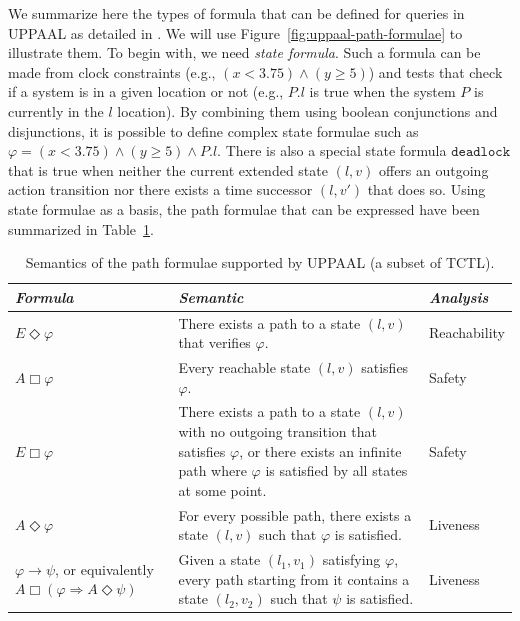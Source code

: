 We summarize here the types of formula that can be defined for queries in UPPAAL as detailed in \cite{UPPAAL}. We will use Figure~\ref{fig:uppaal-path-formulae} to illustrate them. To begin with, we need \emph{state formula}. Such a formula can be made from clock constraints (e.g., $(x < 3.75) \wedge (y \geq 5)$) and tests that check if a system is in a given location or not (e.g., $P.l$ is true when the system $P$ is currently in the $l$ location). By combining them using boolean conjunctions and disjunctions, it is possible to define complex state formulae such as $\varphi = (x < 3.75) \wedge (y \geq 5) \wedge P.l$. There is also a special state formula $\mathtt{deadlock}$ that is true when neither the current extended state $(l, v)$ offers an outgoing action transition nor there exists a time successor $(l, v')$ that does so. Using state formulae as a basis, the path formulae that can be expressed have been summarized in Table~\ref{tab:uppaal-path-formulae}.\\

\begin{table}[htbp]
\footnotesize
\centering
\begin{tabular}{|p{3cm}|p{7cm}|p{2cm}|}
  
  \hline
  
  \textit{Formula} &
  \textit{Semantic} &
  \textit{Analysis} \\
  
  \hline
  
  $E\Diamond \varphi$ &
  There exists a path to a state $(l, v)$ that verifies $\varphi$. &
  Reachability \\
  
  \hline
  
  $A\Box \varphi$ &
  Every reachable state $(l, v)$ satisfies $\varphi$. &
  Safety \\
  
  \hline
  
  $E\Box \varphi$ &
  There exists a path to a state $(l, v)$ with no outgoing transition that satisfies $\varphi$, or there exists an infinite path where $\varphi$ is satisfied by all states at some point. &
  Safety \\
  
  \hline
  
  $A\Diamond \varphi$ &
  For every possible path, there exists a state $(l, v)$ such that $\varphi$ is satisfied. &
  Liveness \\
  
  \hline
  
  $\varphi \rightarrow \psi$, or equivalently $A\Box (\varphi \Rightarrow A\Diamond \psi)$ &
  Given a state $(l_1, v_1)$ satisfying $\varphi$, every path starting from it contains a state $(l_2, v_2)$ such that $\psi$ is satisfied. &
  Liveness \\
  
  \hline
  
\end{tabular}
\caption{Semantics of the path formulae supported by UPPAAL (a subset of TCTL).}
\label{tab:uppaal-path-formulae}
\end{table}

